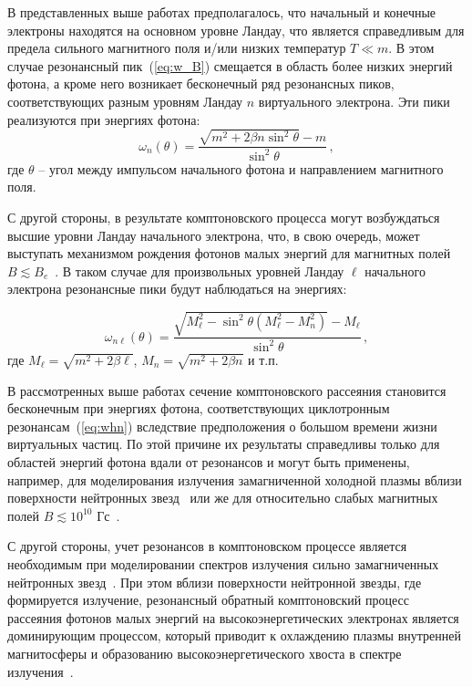\documentclass[cp1251%
               ]{jetp} %
\begin{document}
В представленных выше работах предполагалось, что начальный и конечные электроны находятся 
на основном уровне Ландау, что является справедливым для предела сильного магнитного поля 
и/или низких температур $T\ll m$. В этом случае резонансный 
пик~(\ref{eq:w_B})  смещается в область более низких энергий фотона, а кроме 
него возникает бесконечный ряд резонансных пиков, соответствующих разным 
уровням Ландау $n$ 
виртуального электрона. Эти пики реализуются при энергиях фотона:
\begin{equation}\label{eq:whn}
	\omega_n(\theta)= \frac{\sqrt{m^2+2 \beta n \sin^2\theta} - 
		m}{\sin^2\theta}\, ,
\end{equation}
где $\theta$ -- угол между импульсом начального фотона и направлением 
магнитного поля. 

С другой стороны, в результате комптоновского процесса могут возбуждаться 
высшие уровни Ландау начального электрона, что, в свою очередь, может выступать 
механизмом рождения фотонов малых энергий для магнитных полей $B\lesssim 
B_e$~\cite{Daugherty:1986,Bussard:1986}. В таком случае для произвольных уровней Ландау $\ell$ начального электрона резонансные 
пики будут наблюдаться на энергиях:

\begin{equation}\label{eq:resAll}
	\omega_{n\ell}(\theta)=\frac{\sqrt{M_\ell^2 - \sin^2\theta (M_\ell^2-M_n^2)}-M_\ell}{\sin^2\theta}\, ,
\end{equation}
где $M_\ell=\sqrt{m^2+2\beta \ell}$, $M_n=\sqrt{m^2+2\beta n}$ и т.п.

В рассмотренных выше работах сечение комптоновского рассеяния 
становится бесконечным при энергиях фотона, соответствующих циклотронным 
резонансам~(\ref{eq:whn}) вследствие предположения о 
большом времени жизни виртуальных частиц. По этой причине их результаты 
справедливы только для областей энергий фотона вдали от резонансов
и могут быть применены, например, для моделирования излучения 
замагниченной 
	холодной плазмы вблизи поверхности нейтронных 
	звезд~\cite{Ozel:2001} или же для относительно слабых магнитных 
	полей $B\lesssim 10^{10}$ Гс~\cite{Zavlin:1996}.

С другой стороны, учет резонансов в комптоновском процессе является необходимым 
при моделировании спектров излучения сильно замагниченных нейтронных 
звезд~\cite{Alexander:1991,Araya:1999,Ho:2001,Lyutikov:2006,Potekhin:2004,Schonherr:2007,Nishimura:2008,Suleimanov:2009}.
При этом вблизи поверхности нейтронной звезды, где формируется излучение, резонансный 
обратный комптоновский процесс рассеяния фотонов малых энергий на высокоэнергетических электронах 
является доминирующим процессом, который приводит к охлаждению плазмы 
внутренней магнитосферы и образованию высокоэнергетического хвоста в спектре 
излучения~\cite{Fernandez:2007,Nobili:2008,Baring:2018,Beloborodov:2013}.
\end{document}
